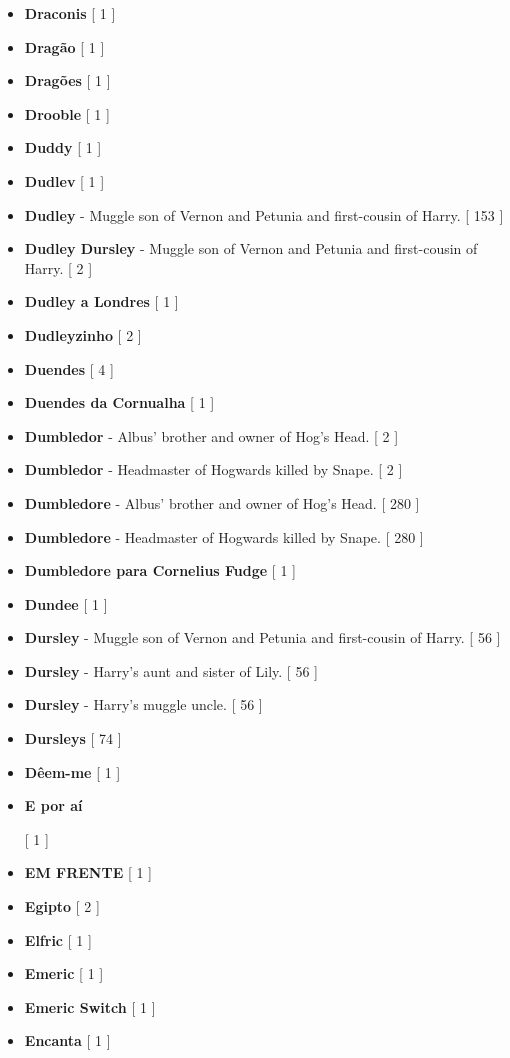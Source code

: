 \documentclass[a4paper]{article}
\begin{document}
\begin{itemize}
	\item \textbf{Draconis} [ 1 ]
	\item \textbf{Dragão} [ 1 ]
	\item \textbf{Dragões} [ 1 ]
	\item \textbf{Drooble} [ 1 ]
	\item \textbf{Duddy} [ 1 ]
	\item \textbf{Dudlev} [ 1 ]
	\item \textbf{Dudley} - Muggle son of Vernon and Petunia and first-cousin of Harry. [ 153 ]
	\item \textbf{Dudley Dursley} - Muggle son of Vernon and Petunia and first-cousin of Harry. [ 2 ]
	\item \textbf{Dudley a Londres} [ 1 ]
	\item \textbf{Dudleyzinho} [ 2 ]
	\item \textbf{Duendes} [ 4 ]
	\item \textbf{Duendes da Cornualha} [ 1 ]
	\item \textbf{Dumbledor} - Albus' brother and owner of Hog's Head. [ 2 ]
	\item \textbf{Dumbledor} - Headmaster of Hogwards killed by Snape. [ 2 ]
	\item \textbf{Dumbledore} - Albus' brother and owner of Hog's Head. [ 280 ]
	\item \textbf{Dumbledore} - Headmaster of Hogwards killed by Snape. [ 280 ]
	\item \textbf{Dumbledore para Cornelius Fudge} [ 1 ]
	\item \textbf{Dundee} [ 1 ]
	\item \textbf{Dursley} - Muggle son of Vernon and Petunia and first-cousin of Harry. [ 56 ]
	\item \textbf{Dursley} - Harry's aunt and sister of Lily. [ 56 ]
	\item \textbf{Dursley} - Harry's muggle uncle. [ 56 ]
	\item \textbf{Dursleys} [ 74 ]
	\item \textbf{Dêem-me} [ 1 ]
	\item \hypertarget{E}{\textbf{E por aí}} [ 1 ]
	\item \textbf{EM FRENTE} [ 1 ]
	\item \textbf{Egipto} [ 2 ]
	\item \textbf{Elfric} [ 1 ]
	\item \textbf{Emeric} [ 1 ]
	\item \textbf{Emeric Switch} [ 1 ]
	\item \textbf{Encanta} [ 1 ]

\end{itemize}
\end{document}
